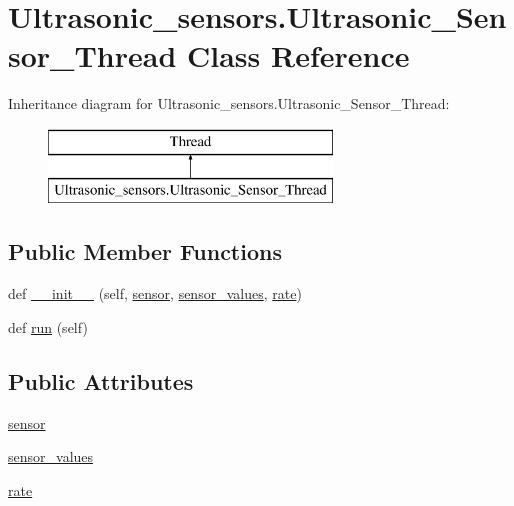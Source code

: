 \hypertarget{class_ultrasonic__sensors_1_1_ultrasonic___sensor___thread}{}\section{Ultrasonic\+\_\+sensors.\+Ultrasonic\+\_\+\+Sensor\+\_\+\+Thread Class Reference}
\label{class_ultrasonic__sensors_1_1_ultrasonic___sensor___thread}
Inheritance diagram for Ultrasonic\+\_\+sensors.\+Ultrasonic\+\_\+\+Sensor\+\_\+\+Thread\+:\begin{figure}[H]
\begin{center}
\leavevmode
\includegraphics[height=2.000000cm]{class_ultrasonic__sensors_1_1_ultrasonic___sensor___thread}
\end{center}
\end{figure}
\subsection*{Public Member Functions}
\begin{DoxyCompactItemize}
\item 
def \mbox{\hyperlink{class_ultrasonic__sensors_1_1_ultrasonic___sensor___thread_a06d1bfe89cff77467a2dca1e4b89cb91}{\+\_\+\+\_\+init\+\_\+\+\_\+}} (self, \mbox{\hyperlink{class_ultrasonic__sensors_1_1_ultrasonic___sensor___thread_a2cb18fd9999c266a7011d3ab17e09c1a}{sensor}}, \mbox{\hyperlink{class_ultrasonic__sensors_1_1_ultrasonic___sensor___thread_aa854d163320bedc21a2db58848afd51c}{sensor\+\_\+values}}, \mbox{\hyperlink{class_ultrasonic__sensors_1_1_ultrasonic___sensor___thread_a2cb683e88f0562d6fed96642ab157a38}{rate}})
\item 
def \mbox{\hyperlink{class_ultrasonic__sensors_1_1_ultrasonic___sensor___thread_ad074f29246b4db6af7b2488ec7d4b276}{run}} (self)
\end{DoxyCompactItemize}
\subsection*{Public Attributes}
\begin{DoxyCompactItemize}
\item 
\mbox{\hyperlink{class_ultrasonic__sensors_1_1_ultrasonic___sensor___thread_a2cb18fd9999c266a7011d3ab17e09c1a}{sensor}}
\item 
\mbox{\hyperlink{class_ultrasonic__sensors_1_1_ultrasonic___sensor___thread_aa854d163320bedc21a2db58848afd51c}{sensor\+\_\+values}}
\item 
\mbox{\hyperlink{class_ultrasonic__sensors_1_1_ultrasonic___sensor___thread_a2cb683e88f0562d6fed96642ab157a38}{rate}}
\end{DoxyCompactItemize}


